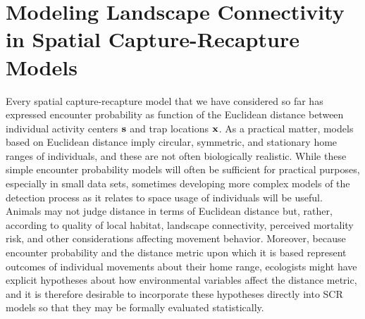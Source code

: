 \chapter{
Modeling Landscape Connectivity in Spatial Capture-Recapture Models
}
\label{chapt.ecoldist}


\vspace{.3in}



Every spatial capture-recapture model that we have considered so far
has expressed encounter probability as function of the Euclidean
distance between individual activity
centers ${\bf s}$ and trap locations ${\bf x}$. 
As a practical matter, models based on Euclidean
distance imply circular, symmetric, and stationary home ranges of
individuals, and these are not often biologically realistic.
While these simple encounter
probability models will often
be sufficient for practical
purposes, especially in small data sets, sometimes developing more
complex models of the detection process as it relates to space usage
of individuals will be useful.  Animals may not judge distance in
terms of Euclidean distance but, rather, according to quality of local
habitat, landscape connectivity, perceived mortality risk, and other
considerations affecting movement behavior.
Moreover, because encounter probability and the distance
metric upon which it is based represent outcomes of individual
movements about their home range, ecologists might have explicit
hypotheses about how environmental variables affect the distance
metric, and it is therefore desirable to incorporate these hypotheses
directly into SCR models so that they may be formally evaluated
statistically.  


